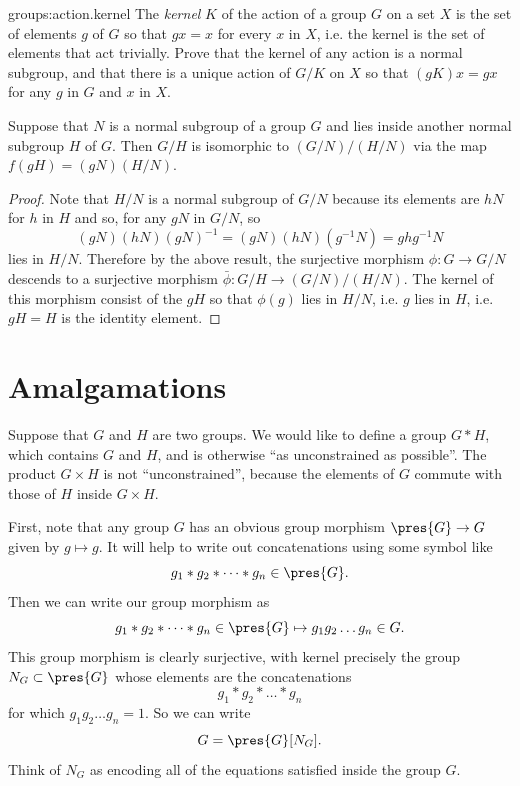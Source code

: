 \begin{problem}{groups:action.kernel}
The \emph{kernel} \(K\) of the action of a group \(G\) on a set \(X\) is the set of elements \(g\) of \(G\) so that \(gx=x\) for every \(x\) in \(X\), i.e. the kernel is the set of elements that act trivially.
Prove that the kernel of any action is a normal subgroup, and that there is a unique action of \(G/K\) on \(X\) so that \((gK)x=gx\) for any \(g\) in \(G\) and \(x\) in \(X\).
\end{problem}


\begin{theorem}
Suppose that \(N\) is a normal subgroup of a group \(G\) and lies inside another normal subgroup \(H\) of \(G\).
Then \(G/H\) is isomorphic to \((G/N)/(H/N)\) via the map \(f(gH)=(gN)(H/N)\).
\end{theorem}
\begin{proof}
Note that \(H/N\) is a  normal subgroup of \(G/N\) because its elements are \(hN\) for \(h\) in \(H\) and so, for any \(gN\) in \(G/N\), so
\[
(gN)(hN)(gN)^{-1}=(gN)(hN)(g^{-1}N)=ghg^{-1}N
\]
lies in \(H/N\).
Therefore by the above result, the surjective morphism \(\phi \colon G \to G/N\) descends to a surjective morphism \(\bar\phi \colon G/H \to (G/N)/(H/N)\). 
The kernel of this morphism consist of the \(gH\) so that \(\phi(g)\) lies in \(H/N\), i.e. \(g\) lies in \(H\), i.e. \(gH=H\) is the identity element.
\end{proof}


\section{Amalgamations}
Suppose that \(G\) and \(H\) are two groups.
We would like to define a group \(G*H\), which contains \(G\) and \(H\), and is otherwise ``as unconstrained as possible''.
The product \(G \times H\) is not ``unconstrained'', because the elements of \(G\) commute with those of \(H\) inside \(G \times H\).

First, note that any group \(G\) has an obvious group morphism \(\pres{G} \to G\) given by \(g \mapsto g\).
It will help to write out concatenations using some symbol like
\[
g_1 * g_2 * \dots * g_n \in \pres{G}.
\]
Then we can write our group morphism as
\[
g_1 * g_2 * \dots * g_n \in \pres{G} \mapsto g_1 g_2 \dots g_n \in G.
\]
This group morphism is clearly surjective, with kernel precisely the group \(N_G \subset \pres{G}\) whose elements are the concatenations
\[
g_1 * g_2 * \dots * g_n
\]
for which \(g_1 g_2 \dots g_n=1\).
So we can write
\[
G=\pres{G}[N_G].
\]
Think of \(N_G\) as encoding all of the equations satisfied inside the group \(G\).

